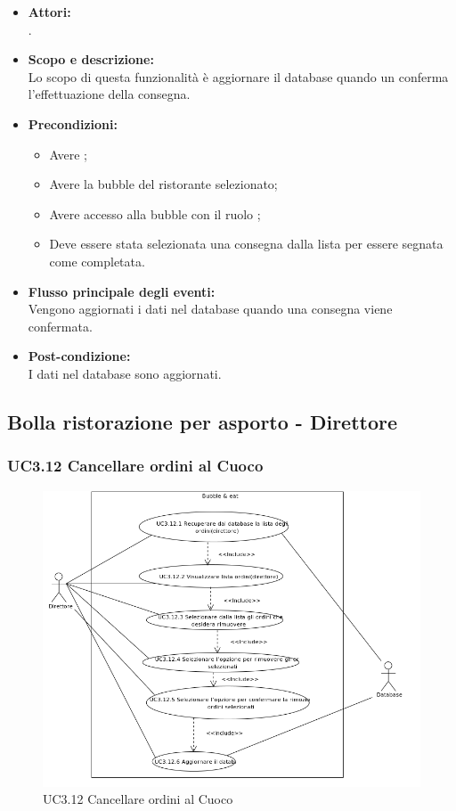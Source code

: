 \begin{itemize}
	\item \textbf{Attori:}
	\\.
	\item \textbf{Scopo e descrizione:} 
	\\Lo scopo di questa funzionalità è aggiornare il database quando un  conferma l’effettuazione della consegna.
	\item \textbf{Precondizioni:}
	\begin{itemize}
		\item Avere ;
		\item Avere la bubble del ristorante selezionato;
		\item Avere accesso alla bubble con il ruolo ;
		\item Deve essere stata selezionata una consegna dalla lista per essere segnata come completata.
	\end{itemize}
	\item \textbf{Flusso principale degli eventi:}
	\\Vengono aggiornati i dati nel database quando una consegna viene confermata.
	\item \textbf{Post-condizione:}
	\\I dati nel database sono aggiornati.
\end{itemize}

\subsection{Bolla ristorazione per asporto - Direttore}

\subsubsection{UC3.12 Cancellare ordini al Cuoco} \label{UC3.12}

\begin{figure}[H]
	\centering
	\includegraphics[width=15cm]{../../documenti/AnalisiDeiRequisiti/Diagrammi_img/uc3_12.png}
	\caption{UC3.12 Cancellare ordini al Cuoco}
\end{figure}

